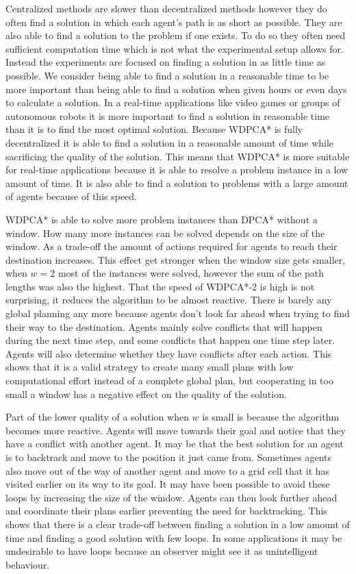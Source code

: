Centralized methods are slower than decentralized methods however they do often
find a solution in which each agent's path is as short as possible. They are
also able to find a solution to the problem if one exists. To do so they often
need sufficient computation time which is not what the experimental setup
allows for. Instead the experiments are focused on finding a solution in as
little time as possible. We consider being able to find a solution in
a reasonable time to be more important than being able to find a solution when
given hours or even days to calculate a solution. In a real-time applications
like video games or groups of autonomous robots it is more important to find a
solution in reasonable time than it is to find the most optimal solution.
Because WDPCA* is fully decentralized it is able to find a solution in a
reasonable amount of time while sacrificing the quality of the solution. This
means that WDPCA* is more suitable for real-time applications because it is
able to resolve a problem instance in a low amount of time. It is also able to
find a solution to problems with a large amount of agents because of this speed.

WDPCA* is able to solve more problem instances than DPCA* without a window. How
many more instances can be solved depends on the size of the window. As a
trade-off the amount of actions required for agents to reach their destination
increases. This effect get stronger when the window size gets smaller, when
$w=2$ most of the instances were solved, however the sum of the path lengths
was also the highest. That the speed of WDPCA*-2 is high is not surprising, it
reduces the algorithm to be almost reactive. There is barely any global
planning any more because agents don't look far ahead when trying to find their
way to the destination. Agents mainly solve conflicts that will
happen during the next time step, and some conflicts that happen one time step
later. Agents will also determine whether they have conflicts after each action.
This shows that it is a valid strategy to create many small plans with
low computational effort instead of a complete global plan, but cooperating in
too small a window has a negative effect on the quality of the solution.

Part of the lower quality of a solution when $w$ is small is because the
algorithm becomes more reactive. Agents will move towards their goal and notice
that they have a conflict with another agent. It may be that the best solution
for an agent is to backtrack and move to the position it just came from.
Sometimes agents also move out of the way of another agent and move to a grid
cell that it has visited earlier on its way to its goal. It may have been
possible to avoid these loops by increasing the size of the window. Agents can
then look further ahead and coordinate their plans earlier preventing the need
for backtracking. This shows that there is a clear trade-off between finding a
solution in a low amount of time and finding a good solution with few loops. In
some applications it may be undesirable to have loops because an observer might
see it as unintelligent behaviour.

